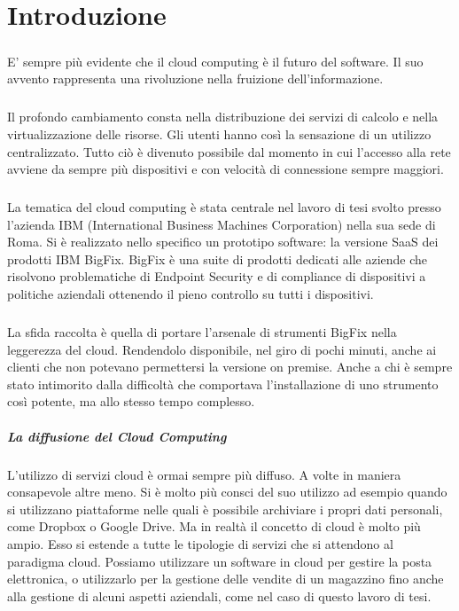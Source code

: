 \chapter{Introduzione}

\paragraph{}
E' sempre più evidente che il cloud computing è il futuro del software. Il suo avvento rappresenta una rivoluzione nella fruizione dell'informazione.
\paragraph{}
Il profondo cambiamento consta nella distribuzione dei servizi di calcolo e nella virtualizzazione delle risorse. Gli utenti hanno così la sensazione di un utilizzo centralizzato. Tutto ciò è divenuto possibile dal momento in cui l'accesso alla rete avviene da sempre più dispositivi e con velocità di connessione sempre maggiori.
\paragraph{}
La tematica del cloud computing è stata centrale nel lavoro di tesi svolto presso l'azienda IBM (International Business Machines Corporation) nella sua sede di Roma. Si è realizzato nello specifico un prototipo software: la versione SaaS dei prodotti IBM BigFix. BigFix è una suite di prodotti dedicati alle aziende che risolvono problematiche di Endpoint Security e di compliance di dispositivi a politiche aziendali ottenendo il pieno controllo su tutti i dispositivi.
\paragraph{}
La sfida raccolta è quella di portare l'arsenale di strumenti BigFix nella leggerezza del cloud. Rendendolo disponibile, nel giro di pochi minuti, anche ai clienti che non potevano permettersi la versione on premise. Anche a chi è sempre stato intimorito dalla difficoltà che comportava l'installazione di uno strumento così potente, ma allo stesso tempo complesso.

\paragraph{La diffusione del Cloud Computing}
L'utilizzo di servizi cloud è ormai sempre più diffuso. A volte in maniera consapevole altre meno. Si è molto più consci del suo utilizzo ad esempio quando si utilizzano piattaforme nelle quali è possibile archiviare i propri dati personali, come Dropbox o Google Drive. Ma in realtà il concetto di cloud è molto più ampio. Esso si estende a tutte le tipologie di servizi che si attendono al paradigma cloud. Possiamo utilizzare un software in cloud per gestire la posta elettronica, o utilizzarlo per la gestione delle vendite di un magazzino fino anche alla gestione di alcuni aspetti aziendali, come nel caso di questo lavoro di tesi.
